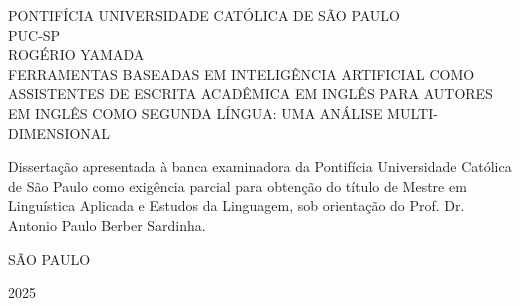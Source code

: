 \begin{titlepage}
    \begin{center}
        {\large \MakeUppercase{Pontifícia Universidade Católica de São Paulo}}\\
        {\large \MakeUppercase{PUC-SP}}\\
        \vspace{5cm}
        {\large \MakeUppercase{Rogério Yamada}}\\
        \vspace{5cm}
        {\Large \MakeUppercase{Ferramentas Baseadas em Inteligência Artificial como Assistentes de Escrita Acadêmica em Inglês para Autores em Inglês como Segunda Língua: Uma Análise Multi-Dimensional}}\\
        \vspace{3cm}
        \begin{adjustwidth}{0.5\textwidth}{0cm}
            Dissertação apresentada à banca examinadora da Pontifícia Universidade Católica de São Paulo como exigência parcial para obtenção do título de Mestre em Linguística Aplicada e Estudos da Linguagem, sob orientação do Prof. Dr. Antonio Paulo Berber Sardinha.
        \end{adjustwidth}
        \vfill
        {\large \MakeUppercase{São Paulo}}
        
        {\large 2025}
    \end{center}
\end{titlepage}


